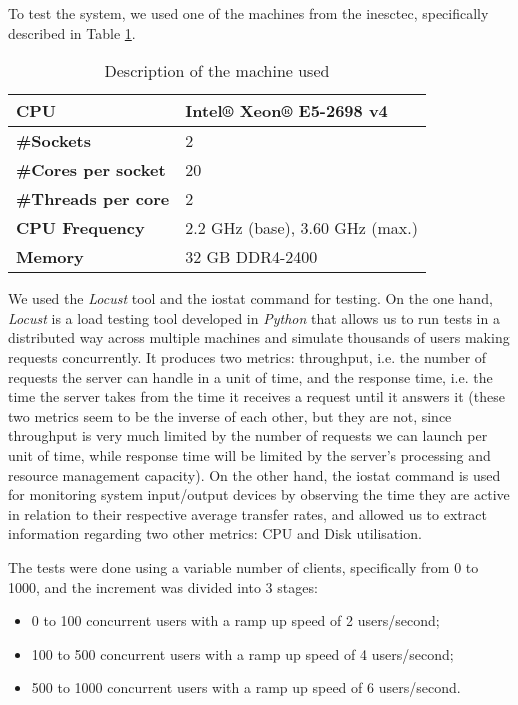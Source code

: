 To test the system, we used one of the machines from the \gls{inesctec}, specifically described in Table \ref{tab:machine}.

  
  \begin{table}[H]
    \centering
    \begin{tabular}{|l|l|}
      \hline
      \textbf{CPU   }        & Intel® Xeon® E5-2698 v4         \\ \hline
      \textbf{\#Sockets}          & 2                              \\ \hline
      \textbf{\#Cores per socket}          & 20                              \\ \hline  
      \textbf{\#Threads per core}          & 2                              \\ \hline
      \textbf{CPU Frequency}       & 2.2 GHz (base), 3.60 GHz (max.) \\ \hline
      \textbf{Memory}          & 32 GB DDR4-2400             \\ \hline
    \end{tabular}
    \caption{\label{tab:machine}Description of the machine used}
  \end{table}
  
  We used the \textit{Locust} \citep{loc} tool and the iostat command for testing. On the one hand, \textit{Locust} is a load testing tool developed in \textit{Python} that allows us to run tests in a distributed way across multiple machines and simulate thousands of users making requests concurrently. It produces two metrics: throughput, i.e. the number of requests the server can handle in a unit of time, and the response time, i.e. the time the server takes from the time it receives a request until it answers it (these two metrics seem to be the inverse of each other, but they are not, since throughput is very much limited by the number of requests we can launch per unit of time, while response time will be limited by the server's processing and resource management capacity). On the other hand, the iostat command is used for monitoring system input/output devices by observing the time they are active in relation to their respective average transfer rates, and allowed us to extract information regarding two other metrics: CPU and Disk utilisation.
   
  The tests were done using a variable number of clients, specifically from 0 to 1000, and the increment was divided into 3 stages:
  \begin{itemize}
      \item 0 to 100 concurrent users with a ramp up speed of 2 users/second;
      \item 100 to 500 concurrent users with a ramp up speed of 4 users/second;
      \item 500 to 1000 concurrent users with a ramp up speed of 6 users/second.
  \end{itemize}
  
